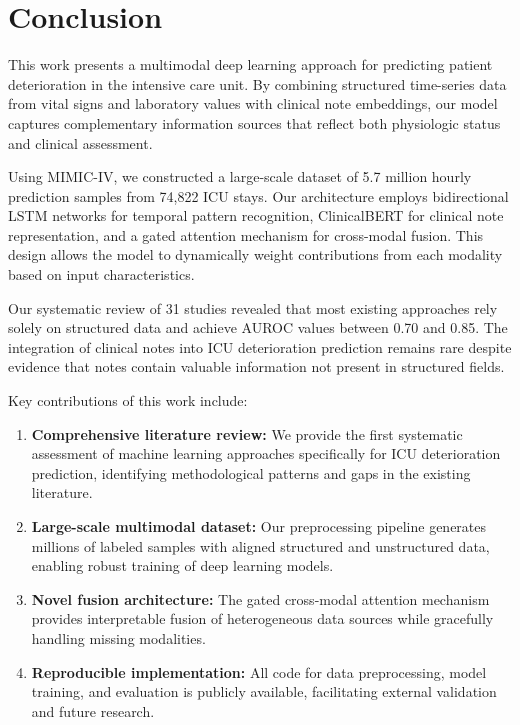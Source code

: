 \section{Conclusion}

This work presents a multimodal deep learning approach for predicting patient deterioration in the intensive care unit. By combining structured time-series data from vital signs and laboratory values with clinical note embeddings, our model captures complementary information sources that reflect both physiologic status and clinical assessment.

Using MIMIC-IV, we constructed a large-scale dataset of 5.7 million hourly prediction samples from 74,822 ICU stays. Our architecture employs bidirectional LSTM networks for temporal pattern recognition, ClinicalBERT for clinical note representation, and a gated attention mechanism for cross-modal fusion. This design allows the model to dynamically weight contributions from each modality based on input characteristics.

Our systematic review of 31 studies revealed that most existing approaches rely solely on structured data and achieve AUROC values between 0.70 and 0.85. The integration of clinical notes into ICU deterioration prediction remains rare despite evidence that notes contain valuable information not present in structured fields.

Key contributions of this work include:

\begin{enumerate}
    \item \textbf{Comprehensive literature review:} We provide the first systematic assessment of machine learning approaches specifically for ICU deterioration prediction, identifying methodological patterns and gaps in the existing literature.

    \item \textbf{Large-scale multimodal dataset:} Our preprocessing pipeline generates millions of labeled samples with aligned structured and unstructured data, enabling robust training of deep learning models.

    \item \textbf{Novel fusion architecture:} The gated cross-modal attention mechanism provides interpretable fusion of heterogeneous data sources while gracefully handling missing modalities.

    \item \textbf{Reproducible implementation:} All code for data preprocessing, model training, and evaluation is publicly available, facilitating external validation and future research.
\end{enumerate}

